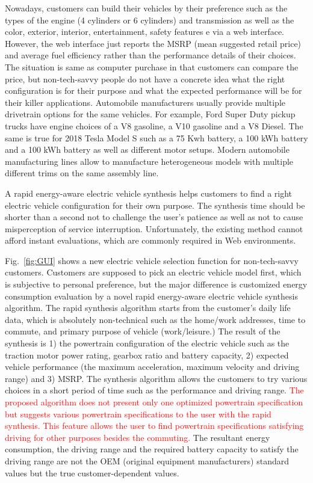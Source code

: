 \documentclass[journal]{IEEEtran}
\begin{document}
Nowadays, customers can build  their  vehicles by their preference such as the types of the engine (4 cylinders or 6 cylinders) and transmission as well as the color, exterior, interior, entertainment, safety features e via a web interface. However, the web interface  just reports  the MSRP (mean suggested retail price) and average fuel efficiency rather than the performance details of their choices. The situation is same as computer purchase in that customers can compare the price, but non-tech-savvy people do not have a concrete idea what the right configuration is for their purpose and what the expected performance will be for their killer applications. 
%
Automobile manufacturers usually provide multiple drivetrain options for the same vehicles. For example, Ford Super Duty pickup trucks have engine choices of a V8 gasoline, a V10 gasoline and a V8 Diesel. The same is true for 2018 Tesla Model S such as a 75 Kwh battery, a 100 kWh battery and a 100 kWh battery as well as different motor setups. Modern automobile manufacturing lines allow to manufacture heterogeneous models with multiple different trims on the same assembly line. 

A rapid energy-aware electric vehicle synthesis helps customers to find a right electric vehicle configuration for their own purpose. The synthesis time should be shorter than a second not to challenge the user’s patience as well as not to cause misperception of service interruption. Unfortunately, the existing method cannot afford instant evaluations, which are commonly required in Web environments. 

Fig.~\ref{fig:GUI} shows a new electric vehicle selection function for non-tech-savvy customers. Customers are supposed to pick an electric vehicle model first, which is subjective to personal preference, but the major difference is customized energy consumption evaluation by a novel rapid energy-aware electric vehicle synthesis algorithm. The rapid synthesis algorithm starts from the customer’s daily life data, which is absolutely non-technical such as the home/work addresses, time to commute, and primary purpose of vehicle (work/leisure.) The result of the synthesis is 1) the powertrain configuration of the electric vehicle such as the traction motor power rating, gearbox ratio and battery capacity, 2) expected vehicle performance (the maximum acceleration, maximum velocity and driving range) and 3) MSRP. The synthesis algorithm allows the customers to try various choices in a short period of time such as the performance and driving range. 
\textcolor{red}{The proposed algorithm does not present only one optimized powertrain specification but suggests various powertrain specifications to the user with the rapid synthesis. This feature allows the user to find powertrain specifications satisfying driving for other purposes besides the commuting.}
The resultant energy consumption, the driving range and the required battery capacity to satisfy the driving range are not the OEM (original equipment manufacturers) standard values but the true customer-dependent values. 
\end{document}
